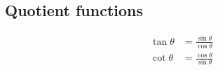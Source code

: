 \subsection*{Quotient functions}

\begin{align*}
  \tan \theta &= \frac{\sin \theta}{\cos \theta}\\
  \cot \theta &= \frac{\cos \theta}{\sin \theta}\\
\end{align*}